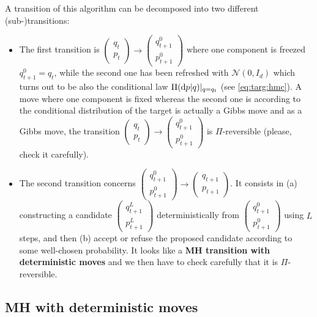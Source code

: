 \documentclass[english,graybox,envcountchap,envcountsame,sectrefs,shortlabels]{svmono}
\theoremstyle{style}
\newcommand{\gauss}{\mathcal{N}}
\begin{document}
A transition of this algorithm can be decomposed into two different (sub-)transitions:
\begin{itemize}
\item The first transition is $\begin{pmatrix}
q_t\\
p_t
\end{pmatrix} \rightarrow
\begin{pmatrix}
q_{t+1}^0\\
p_{t+1}^0
\end{pmatrix}$
where one component is freezed $q_{t+1}^0=q_t$, while the second one has been refreshed with $\gauss(0,I_d)$ which turns out to be also the conditional law $\Pi(\mathrm{d} p|q)|_{q=q_t}$ (see \eqref{eq:targ:hmc}). A move where one component is fixed whereas the second one is according to the conditional distribution of the target is actually a Gibbs move and as a Gibbs move, the transition $\begin{pmatrix}
q_t\\
p_t
\end{pmatrix} \rightarrow
\begin{pmatrix}
q_{t+1}^0\\
p_{t+1}^0
\end{pmatrix}$ is $\Pi$-reversible (please, check it carefully).
\item The second transition concerns $\begin{pmatrix}
q_{t+1}^0\\
p_{t+1}^0
\end{pmatrix} \rightarrow
\begin{pmatrix}
q_{t+1}\\
p_{t+1}
\end{pmatrix}$. It consists in (a) constructing a candidate $\begin{pmatrix}
q_{t+1}^L\\
p_{t+1}^L
\end{pmatrix}$ deterministically from $\begin{pmatrix}
q_{t+1}^0\\
p_{t+1}^0
\end{pmatrix}$ using $L$ steps, and then (b) accept or refuse the proposed candidate according to some well-chosen probability. It looks like a  {\bf MH transition with deterministic moves} and we then have to check carefully that it is $\Pi$-reversible.
\end{itemize}

\subsection{MH with deterministic moves}
\end{document}
